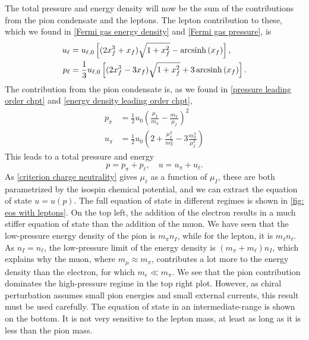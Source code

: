 The total pressure and energy density will now be the sum of the contributions from the pion condensate and the leptons.
The lepton contribution to these, which we found in \autoref{Fermi gas energy density} and \autoref{Fermi gas pressure}, is
%
\begin{align}
    u_\ell 
    &= u_{\ell,0} 
    \left[(2x_f^3 + x_f) \sqrt{1 + x_f^2} - \operatorname{arcsinh}\left(x_f\right)\right], \\
    p_\ell
    &=\frac{1}{3} u_{\ell,0}
    \left[(2x_f^3 - 3x_f) \sqrt{1 + x_f^2} + 3\operatorname{arcsinh}\left(x_f\right)\right].
\end{align}
%
The contribution from the pion condensate is, as we found in \autoref{pressure leading order chpt} and \autoref{energy density leading order chpt},
%
\begin{align}
    p_\pi &= \frac{1}{2} u_0 \left( \frac{\mu_I}{m_\pi} - \frac{m_\pi}{\mu_I}\right)^2 \\
    u_\pi &= \frac{1}{2} u_0 \left( 2 + \frac{\mu_I^2}{m_\pi^2} - 3 \frac{m_\pi^2}{\mu_I^2}  \right)
\end{align}
%
This leads to a total pressure and energy
%
\begin{equation}
    p = p_\pi + p_\ell, \quad u = u_\pi + u_\ell.
\end{equation}
%
As \autoref{criterion charge neutrality} gives $\mu_\ell$ as a function of $\mu_I$, these are both parametrized by the isospin chemical potential, and we can extract the equation of state $u = u(p)$.
The full equation of state in different regimes is shown in \autoref{fig: eos with leptons}.
On the top left, the addition of the electron results in a much stiffer equation of state than the addition of the muon.
We have seen that the low-pressure energy density of the pion is $m_\pi n_I $, while for the lepton, it is $m_\ell n_\ell$.
As $n_I = n_\ell$, the low-pressure limit of the energy density is $(m_\pi + m_\ell)n_ I$, which explains why the muon, where $m_\mu \approx m_\pi$, contributes a lot more to the energy density than the electron, for which $m_e \ll m_\pi$.
We see that the pion contribution dominates the high-pressure regime in the top right plot.
However, as chiral perturbation assumes small pion energies and small external currents, this result must be used carefully.
The equation of state in an intermediate-range is shown on the bottom.
It is not very sensitive to the lepton mass, at least as long as it is less than the pion mass.

